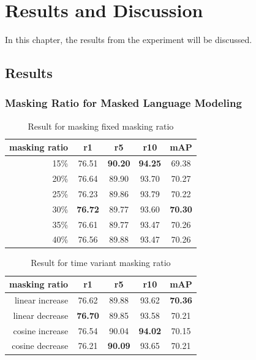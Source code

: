 

\chapter{Results and Discussion}
In this chapter, the results from the experiment will be discussed.

\section{Results}

\subsection{Masking Ratio for Masked Language Modeling}

\begin{table}[htbp]
    \centering
    \caption{Result for masking fixed masking ratio}
    \label{tb:fixed_mlm}
    
    \begin{tabular}{rcccc}
    masking ratio & r1 & r5 & r10 & mAP\\ \hline
    15\% & 76.51 & \textbf{90.20} & \textbf{94.25} & 69.38 \\
    20\% & 76.64 & 89.90 & 93.70 & 70.27 \\
    25\% & 76.23 & 89.86 & 93.79 & 70.22 \\
    30\% & \textbf{76.72} & 89.77 & 93.60 & \textbf{70.30} \\
    35\% & 76.61 & 89.77 & 93.47 & 70.26 \\
    40\% & 76.56 & 89.88 & 93.47 & 70.26
    \end{tabular}
\end{table}

\begin{table}[htbp]
    \centering
    \caption{Result for time variant masking ratio}
    \label{tb:time_variant_mlm}
    \begin{tabular}{rcccc}
      \centering
      masking ratio & r1 & r5 & r10 & mAP\\ \hline
      linear increase & 76.62 & 89.88 & 93.62 & \textbf{70.36} \\
      linear decrease & \textbf{76.70} & 89.85 & 93.58 & 70.21 \\
      cosine increase & 76.54 & 90.04 & \textbf{94.02} & 70.15 \\
      cosine decrease & 76.21 & \textbf{90.09} & 93.65 & 70.21 \\
    \end{tabular}
  \end{table}


